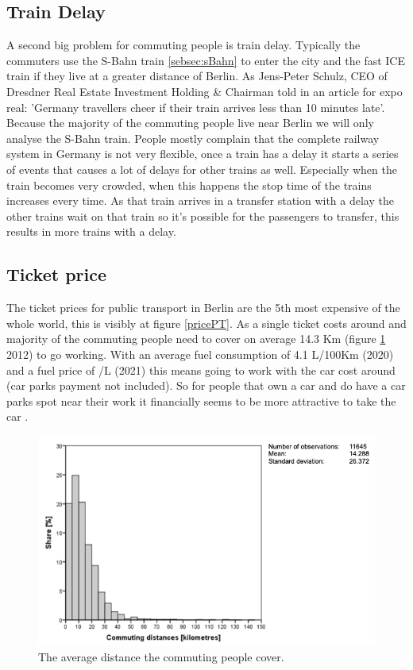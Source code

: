 \subsection{Train Delay}
A second big problem for commuting people is train delay. Typically the commuters use  the S-Bahn train \ref{sebsec:sBahn} to enter the city and the fast ICE train if they live at a greater distance of Berlin. As Jens-Peter Schulz, CEO of Dresdner Real Estate Investment Holding \& Chairman told in an article for expo real: 'Germany travellers cheer if their train arrives less than 10 minutes late'. Because the majority of the commuting people live near Berlin we will only analyse the S-Bahn train. People mostly complain that the complete railway system in Germany is not very flexible, once a train has a delay it starts a series of events that causes a lot of delays for other trains as well. Especially when the train becomes very crowded, when this happens the stop time of the trains increases every time. As that train arrives in a transfer station with a delay the other trains wait on that train so it's possible for the passengers to transfer, this results in more trains with a delay. 

\subsection{Ticket price} \label{subsec:ticketprice}
The ticket prices for public transport in Berlin are the 5th most expensive of the whole world, this is visibly at figure \ref{pricePT}. As a single ticket costs around  and majority of the commuting people need to cover on average 14.3 Km (figure \ref{averageComDis} 2012) to go working. With an average fuel consumption of 4.1 L/100Km (2020) and a fuel price of  /L (2021) this means going to work with the car cost around  (car parks payment not included). So for people that own a car and do have a car parks spot near their work it financially seems to be more attractive to take the car . 

\begin{figure}[h!]
	\centering
	\includegraphics[width=0.55\textheight]{ProblemsFigures/averageCommutingDistance}
	\caption{The average distance the commuting people cover. }
	\label{averageComDis}
\end{figure}

